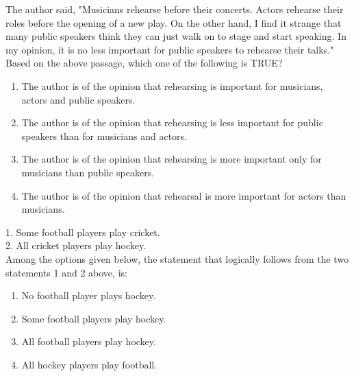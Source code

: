 \item The author said, "Musicians rehearse before their concerts. Actors rehearse their roles before the opening of a new play. On the other hand, I find it strange that many public speakers think they can just walk on to stage and start speaking. In my opinion, it is no less important for public speakers to rehearse their talks."\\
Based on the above passage, which one of the following is TRUE?
\begin{multicols}{2}
    \begin{enumerate}
        \item The author is of the opinion that rehearsing is important for musicians, actors and public speakers.
        \item The author is of the opinion that rehearsing is less important for public speakers than for musicians and actors.
        \item The author is of the opinion that rehearsing is more important only for musicians than public speakers.
        \item The author is of the opinion that rehearsal is more important for actors than musicians.
    \end{enumerate}
\end{multicols}

\item 1. Some football players play cricket.\\
2. All cricket players play hockey.\\
Among the options given below, the statement that logically follows from the two statements 1 and 2 above, is:
\begin{multicols}{2}
    \begin{enumerate}
        \item No football player plays hockey.
        \item Some football players play hockey.
        \item All football players play hockey.
        \item All hockey players play football.
    \end{enumerate}
\end{multicols}

